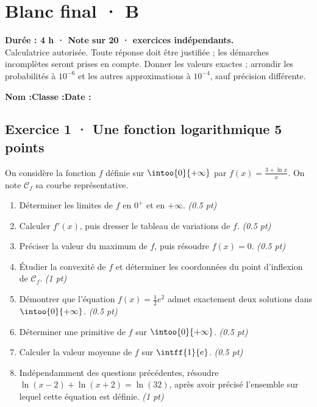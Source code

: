 \fi

\fi

\ifmxteacher

\mxnewpage{}\label{sujet:9-4}

\section*{Blanc final · B}


\textbf{Durée : 4 h · Note sur 20 ·  exercices indépendants.}\\Calculatrice autorisée. Toute réponse doit être justifiée ; les démarches incomplètes seront prises en compte. Donner les valeurs exactes ; arrondir les probabilités à $10^{-6}$ et les autres approximations à $10^{-4}$, sauf précision différente.

\smallskip\textbf{Nom :}\enspace\dotfill\quad\textbf{Classe :}\enspace\dotfill\quad\textbf{Date :}\enspace\dotfill

\subsection*{Exercice 1 · Une fonction logarithmique \hfill 5 points}On considère la fonction $f$ définie sur $\intoo{0}{+\infty}$ par $f(x)=\frac{3+\ln x}x$. On note $\mathcal C_f$ sa courbe représentative.

\begin{enumerate}

\item Déterminer les limites de $f$ en $0^+$ et en $+\infty$. \hfill\textit{(\num{0,5} pt)}

\item Calculer $f' (x)$, puis dresser le tableau de variations de $f$. \hfill\textit{(\num{0,5} pt)}

\item Préciser la valeur du maximum de $f$, puis résoudre $f(x)=0$. \hfill\textit{(\num{0,5} pt)}

\item Étudier la convexité de $f$ et déterminer les coordonnées du point d'inflexion de $\mathcal C_f$. \hfill\textit{(1 pt)}

\item Démontrer que l'équation $f(x)=\frac12 e^{2}$ admet exactement deux solutions dans $\intoo{0}{+\infty}$. \hfill\textit{(\num{0,5} pt)}

\item Déterminer une primitive de $f$ sur $\intoo{0}{+\infty}$. \hfill\textit{(\num{0,5} pt)}

\item Calculer la valeur moyenne de $f$ sur $\intff{1}{e}$. \hfill\textit{(\num{0,5} pt)}

\item Indépendamment des questions précédentes, résoudre $\ln(x-2)+\ln(x+2)=\ln(32)$, après avoir précisé l'ensemble sur lequel cette équation est définie. \hfill\textit{(1 pt)}

\end{enumerate}

